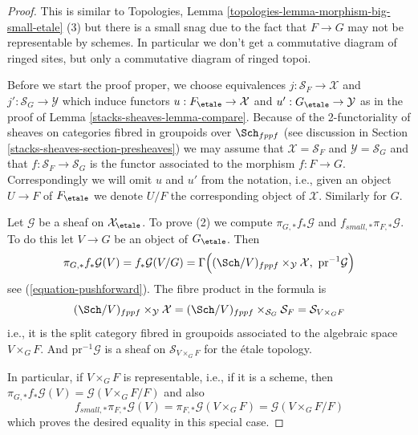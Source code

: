 \begin{proof}
This is similar to
Topologies, Lemma \ref{topologies-lemma-morphism-big-small-etale} (3)
but there is a small snag due to the fact that $F \to G$ may not be
representable by schemes. In particular we don't get a commutative diagram
of ringed sites, but only a commutative diagram of ringed topoi.

\medskip\noindent
Before we start the proof proper, we choose equivalences
$j : \mathcal{S}_F \to \mathcal{X}$ and
$j' : \mathcal{S}_G \to \mathcal{Y}$ which induce functors
$u : F_\etale \to \mathcal{X}$ and
$u' : G_\etale \to \mathcal{Y}$ as in the proof of
Lemma \ref{stacks-sheaves-lemma-compare}. Because of the 2-functoriality of
sheaves on categories fibred in groupoids over $\Sch_{fppf}$
(see discussion in Section \ref{stacks-sheaves-section-presheaves})
we may assume that $\mathcal{X} = \mathcal{S}_F$ and
$\mathcal{Y} = \mathcal{S}_G$ and that $f : \mathcal{S}_F \to \mathcal{S}_G$
is the functor associated to the morphism $f : F \to G$. Correspondingly
we will omit $u$ and $u'$ from the notation, i.e., given an object
$U \to F$ of $F_\etale$ we denote $U/F$
the corresponding object of $\mathcal{X}$. Similarly for $G$.

\medskip\noindent
Let $\mathcal{G}$ be a sheaf on $\mathcal{X}_\etale$.
To prove (2) we compute $\pi_{G, *}f_*\mathcal{G}$ and
$f_{small, *}\pi_{F, *}\mathcal{G}$. To do this let $V \to G$ be an object
of $G_\etale$. Then
$$
\pi_{G, *}f_*\mathcal{G}(V) = f_*\mathcal{G}(V/G) =
\Gamma\Big(
(\Sch/V)_{fppf} \times_{\mathcal{Y}} \mathcal{X},
\ \text{pr}^{-1}\mathcal{G}\Big)
$$
see (\ref{equation-pushforward}). The fibre product in the formula is
$$
(\Sch/V)_{fppf} \times_{\mathcal{Y}} \mathcal{X} =
(\Sch/V)_{fppf} \times_{\mathcal{S}_G} \mathcal{S}_F =
\mathcal{S}_{V \times_G F}
$$
i.e., it is the split category fibred in groupoids associated to the
algebraic space $V \times_G F$. And $\text{pr}^{-1}\mathcal{G}$ is a
sheaf on $\mathcal{S}_{V \times_G F}$ for the \'etale topology.

\medskip\noindent
In particular, if $V \times_G F$ is representable, i.e., if it is a scheme,
then $\pi_{G, *}f_*\mathcal{G}(V) = \mathcal{G}(V \times_G F/F)$ and
also
$$
f_{small, *}\pi_{F, *}\mathcal{G}(V) =
\pi_{F, *}\mathcal{G}(V \times_G F) =
\mathcal{G}(V \times_G F/F)
$$
which proves the desired equality in this special case.


\end{proof}
